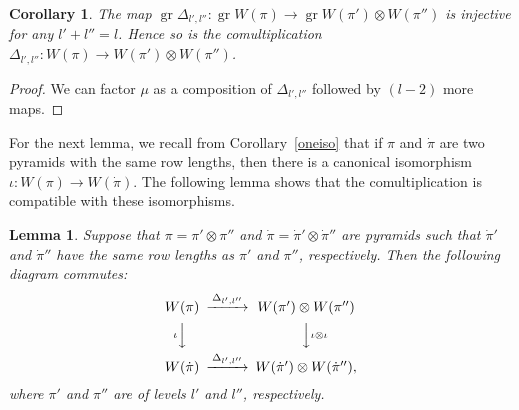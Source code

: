 \documentclass[twoside,12pt,reqno]{amsart}
\newtheorem{Lemma}[Proposition]{Lemma}
\newtheorem{Corollary}[Proposition]{Corollary}
\def\gr{\operatorname{gr}}
\begin{document}
\begin{Corollary}\label{injy}
The map
$\gr\Delta_{l',l''}:
\gr W(\pi) \rightarrow \gr W(\pi') \otimes W(\pi'')$ 
is injective for any $l'+l'' = l$.
Hence so is the comultiplication
$\Delta_{l',l''}:W(\pi) \rightarrow W(\pi') \otimes W(\pi'')$.
\end{Corollary}

\begin{proof}
We can factor $\mu$ as a composition of $\Delta_{l',l''}$
followed by $(l-2)$ more maps.
\end{proof}

For the next lemma, we recall from Corollary~\ref{oneiso}
that if $\pi$ and $\dot\pi$ are two pyramids with the same
row lengths, then there is a canonical isomorphism
$\iota:W(\pi) \rightarrow W(\dot\pi)$.
The following lemma shows that the comultiplication
is compatible with these isomorphisms.

\begin{Lemma}\label{cube}
Suppose that $\pi = \pi' \otimes \pi''$
and $\dot\pi = \dot\pi' \otimes \dot\pi''$ 
are pyramids such that $\dot\pi'$ and $\dot\pi''$ 
have the same
row lengths as $\pi'$ and $\pi''$, respectively.
Then the following diagram commutes:
$$
\begin{CD}
W(\pi) & @>\Delta_{l',l''}>> &W(\pi') \otimes W(\pi'')\\
@V\iota VV&&@VV\iota\otimes\iota V\\
W(\dot\pi) & @>\Delta_{l',l''}>> &W(\dot\pi') \otimes W(\dot\pi''),
\end{CD}
$$
where $\pi'$ and $\pi''$ are of levels $l'$ and $l''$,
respectively.
\end{Lemma}
\end{document}
